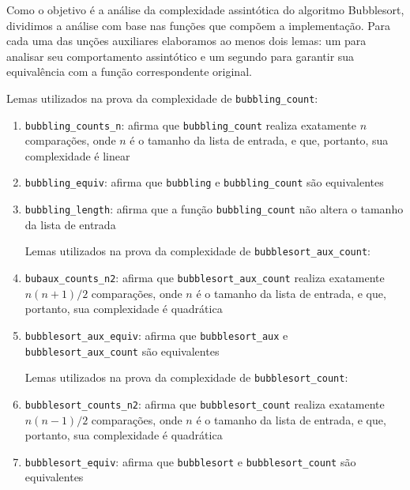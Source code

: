 Como o objetivo é a análise da complexidade assintótica do algoritmo Bubblesort,
dividimos a análise com base nas funções que compõem a implementação. Para cada
uma das unções auxiliares elaboramos ao menos dois lemas: um para analisar seu
comportamento assintótico e um segundo para garantir sua equivalência com a
função correspondente original.

\hspace{0.27cm} Lemas utilizados na prova da complexidade de \texttt{bubbling\_count}:
\begin{enumerate}
    \item \label{lemma:bcount} \texttt{bubbling\_counts\_n}: afirma que \texttt{bubbling\_count} realiza exatamente $n$ comparações, onde $n$ é o tamanho da lista de entrada, e que, portanto, sua complexidade é linear
    \item \label{lemma:bequiv} \texttt{bubbling\_equiv}: afirma que \texttt{bubbling} e \texttt{bubbling\_count} são equivalentes
    \item \label{lemma:blen} \texttt{bubbling\_length}: afirma que a função \texttt{bubbling\_count} não altera o tamanho da lista de entrada

\vspace{1cm}
Lemas utilizados na prova da complexidade de \texttt{bubblesort\_aux\_count}:

    \item \label{lemma:bacount} \texttt{bubaux\_counts\_n2}: afirma que \texttt{bubblesort\_aux\_count} realiza exatamente $n(n+1)/2$ comparações, onde $n$ é o tamanho da lista de entrada, e que, portanto, sua complexidade é quadrática
    \item \label{lemma:baequiv} \texttt{bubblesort\_aux\_equiv}: afirma que \texttt{bubblesort\_aux} e \texttt{bubblesort\_aux\_count} são equivalentes

\vspace{1cm}
Lemas utilizados na prova da complexidade de \texttt{bubblesort\_count}:

    \item \label{lemma:bscount} \texttt{bubblesort\_counts\_n2}: afirma que \texttt{bubblesort\_count} realiza exatamente $n(n-1)/2$ comparações, onde $n$ é o tamanho da lista de entrada, e que, portanto, sua complexidade é quadrática
    \item \label{lemma:bsequv} \texttt{bubblesort\_equiv}: afirma que \texttt{bubblesort} e \texttt{bubblesort\_count} são equivalentes
\end{enumerate}

